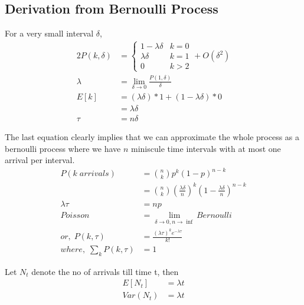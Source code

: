 \documentclass[../probability-notes.tex]{subfiles}
\begin{document}
    \subsection{Derivation from Bernoulli Process}
    For a very small interval $\delta$,
    \begin{alignat*}{2}
        P(k, \delta) &= \begin{cases} 1-\lambda \delta &\mbox{$k = 0$}\\
                                     \lambda \delta &\mbox{$k = 1$}\\
                                     0 &\mbox{$k > 2$} \end{cases} + O(\delta^{2})\\
        \lambda &= \lim_{\delta \to 0}\frac{P(1,\delta)}{\delta} \tag*{arrival rate per unit time}\\
        E[k] &= (\lambda \delta) * 1 + (1-\lambda \delta) * 0\\
            &= \lambda \delta \\
        \tau &= n \delta
    \end{alignat*}
    
    The last equation clearly implies that we can approximate the whole process as a bernoulli process where we have $n$ miniscule time intervals with at most one arrival per interval.
    \begin{align*}
        P(k\; arrivals) &= \binom{n}{k} p^{k} (1-p)^{n-k} \\
            &= \binom{n}{k} (\frac{\lambda \delta}{n})^{k} (1 - \frac{\lambda \delta}{n})^{n-k}\\
        \lambda \tau &= np \tag*{or, arrival rate * time = E[arrivals]}\\
        Poisson &= \lim_{\delta \to 0, n \to \inf} Bernoulli\\
        or,\; P(k, \tau) &= \frac{(\lambda \tau)^{k} e^{-\lambda \tau}}{k!} \tag*{$k = 0,1, \cdots$, for a given $\tau$}\\
        where,\; \sum_{k} P(k, \tau) &= 1 \tag*{for a given $\tau$}
    \end{align*}

    Let $N_{t}$ denote the no of arrivals till time t, then
    \begin{align*}
        E[N_{t}] &= \lambda t\\
        Var(N_{t}) &= \lambda t
    \end{align*}
\end{document}
